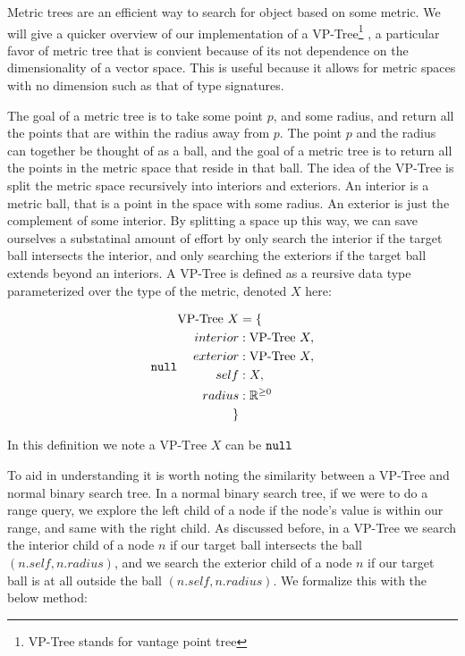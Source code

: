 Metric trees are an efficient way to search for object based on some metric.
We will give a quicker overview of our implementation of a VP-Tree\footnote{VP-Tree stands for vantage point tree} \cite{j2kun_2014},
a particular favor of metric tree that is convient because of its not dependence on the dimensionality of a vector space.
This is useful because it allows for metric spaces with no dimension such as that of type signatures.

The goal of a metric tree is to take some point $p$, and some radius, and return all the points that are within the radius away from $p$.
The point $p$ and the radius can together be thought of as a ball, and the goal of a metric tree is to return all the points in the metric space 
    that reside in that ball.
The idea of the VP-Tree is split the metric space recursively into interiors and exteriors.
An interior is a metric ball, that is a point in the space with some radius.
An exterior is just the complement of some interior.
By splitting a space up this way, 
we can save ourselves a substatinal amount of effort by only search the interior if the target ball intersects the interior,
and only searching the exteriors if the target ball extends beyond an interiors.
A VP-Tree is defined as a reursive data type parameterized over the type of the metric, denoted $X$ here:

\begin{align*}
\text{VP-Tree } X &= \{ \\ 
interior &: \text{VP-Tree } X, \\ 
exterior &: \text{VP-Tree } X, \\ 
self &: X, \\ 
radius &: \Rnn \\
\}
\end{align*}

In this definition we note a $\text{VP-Tree } X$ can be $\texttt{null}$

To aid in understanding it is worth noting the similarity between a VP-Tree and normal binary search tree.
In a normal binary search tree,
if we were to do a range query,
we explore the left child of a node if the node's value is within our range,
and same with the right child.
As discussed before,
in a VP-Tree we search the interior child of a node $n$ if our target ball intersects the ball $(n.self, n.radius)$,
and we search the exterior child of a node $n$ if our target ball is at all outside the ball $(n.self, n.radius)$.
We formalize this with the below method:

